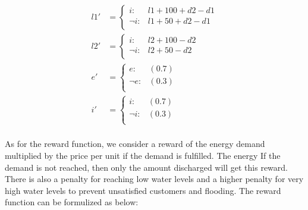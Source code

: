 \documentclass[letterpaper]{article}
\renewcommand{\-}{\text{-}}
\begin{document}
{\footnotesize
\begin{align*}
l1' & = \begin{cases}
i     : & l1 + 100 +d2  - d1 \\
\neg i: &  l1 + 50 +d2  - d1   \\
\end{cases}\\
l2' & =  \begin{cases}
i     : &l2+100 - d2\\
\neg i: &l2+50 - d2\\
 \end{cases}\\
 e' & = \begin{cases}
 e     : & (0.7) \\
 \neg e: &  (0.3)   \\
 \end{cases}\\
i' & = \begin{cases}
i     : & (0.7) \\
\neg i: &  (0.3)   \\
\end{cases}\\
\end{align*}}

As for the reward function, we consider a reward of the energy demand multiplied by the price per unit if the demand is fulfilled. The energy  If the demand is not reached, then only
the amount discharged will get this reward. There is also a penalty for reaching low water levels and a higher penalty for very high water levels to prevent unsatisfied customers and  flooding. The reward function can be formulized as below: 
\end{document}
